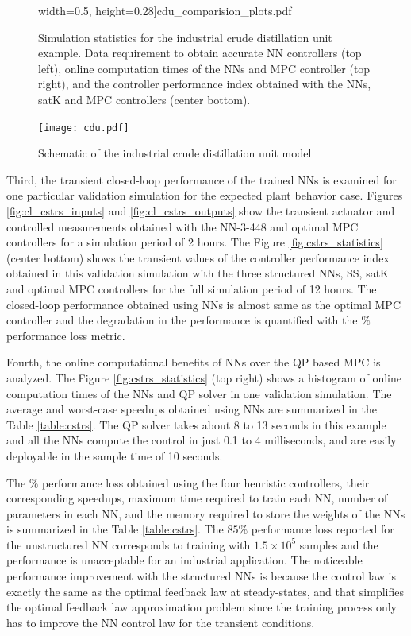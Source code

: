 \documentclass[preprint,5p, twocolumn, authoryear]{elsarticle}
\begin{document}
\begin{figure}[!h]
\begin{center}
        width=0.5\textwidth, 
        height=0.28\textheight]{cdu_comparision_plots.pdf}\end{center}
    \vspace{-0.2in}
    \caption{Simulation statistics for the industrial 
    crude distillation unit example. Data requirement to obtain accurate NN controllers (top left), online computation times of the NNs and 
    MPC controller (top right), 
    and the controller performance index obtained with the NNs, 
    satK and MPC controllers (center bottom).}	
    \label{fig:cdu_statistics}
\end{figure}

\begin{figure}[!h]
    \centering
    \texttt{[image: cdu.pdf]}
    \caption{Schematic of the industrial crude distillation unit model}
    \label{fig:schematic_cdu}
\end{figure}

Third, the transient closed-loop 
performance of the trained NNs is examined
for one particular validation 
simulation for the expected plant behavior case. 
Figures \ref{fig:cl_cstrs_inputs} and \ref{fig:cl_cstrs_outputs}
show the transient actuator 
and controlled measurements obtained with the NN-3-448 and 
optimal MPC controllers for a simulation period of 2 hours.
The Figure \ref{fig:cstrs_statistics} (center bottom)
shows the transient values of the controller performance index
obtained in this validation simulation
with the three structured NNs, SS, satK 
and optimal MPC controllers for the full 
simulation period of 12 hours. The closed-loop 
performance obtained using NNs is almost same as the optimal MPC 
controller and the degradation in the performance 
is quantified with the $\%$ performance loss metric.

Fourth, the online computational benefits of NNs 
over the QP based MPC is analyzed. The Figure 
\ref{fig:cstrs_statistics} (top right)
shows a histogram of online computation times
of the NNs and QP solver in one validation
simulation. The average and worst-case speedups
obtained using NNs are summarized in the 
Table \ref{table:cstrs}. The QP solver takes 
about 8 to 13 seconds in this example and all the 
NNs compute the control in just 0.1 to 4
milliseconds, and are easily deployable in the 
sample time of 10 seconds.

The $\%$ performance loss 
obtained using the four heuristic controllers, 
their corresponding speedups, maximum time required to 
train each NN, number of parameters in each NN, 
and the memory required to store  
the weights of the NNs is summarized in the 
Table \ref{table:cstrs}. The 
$85 \%$ performance loss 
reported for the unstructured
NN corresponds to training with $1.5 \times 10^5$  
samples and the performance is unacceptable 
for an industrial application. 
The noticeable performance improvement with the
structured NNs is because the control law 
is exactly the same as the optimal feedback law
at steady-states, and that simplifies
the optimal feedback law approximation problem
since the training process only has to improve the 
NN control law for the transient conditions. 
\end{document}
